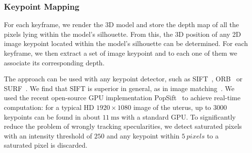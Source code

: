 \subsubsection{Keypoint Mapping}
\label{sec:preparing}
For each keyframe, we render the 3D model and store the depth map of all the pixels lying within the model's silhouette. %
From this, the 3D position  of any 2D image keypoint located within the model's silhouette can be determined.
For each keyframe, we then extract a set of image keypoint and to each one of them we associate its corresponding depth. 

The approach can be used with any keypoint detector, such as SIFT~\cite{Lowe:2004:DIF:993451.996342}, ORB~\cite{orbslam_laparo} or SURF~\cite{SURF}. We find that SIFT is superior in general, as in image matching~\cite{Tuytelaars2007}. We used the recent open-source GPU implementation PopSift~\cite{Griwodz2018Popsift} to achieve real-time computation: for a typical HD $1920\times1080$ image of the uterus, up to $3000$ keypoints can be found in about $\SI{11}{\milli\second}$ with a standard GPU.
To significantly reduce the problem of wrongly tracking specularities, we detect saturated pixels with an intensity threshold of $250$ and any keypoint within $\SI{5}{pixels}$ to a saturated pixel is discarded.  


